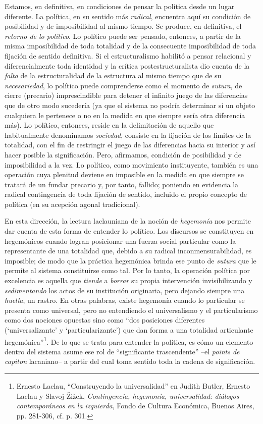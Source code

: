 Estamos, en definitiva, en condiciones de pensar la política desde un
lugar diferente. La política, en su sentido más \emph{radical},
encuentra aquí su condición de posibilidad y de imposibilidad al mismo
tiempo. Se produce, en definitiva, el \emph{retorno de lo político}. Lo
político puede ser pensado, entonces, a partir de la misma imposibilidad
de toda totalidad y de la consecuente imposibilidad de toda fijación de
sentido definitiva. Si el estructuralismo habilitó a pensar relacional y
diferencialmente toda identidad y la crítica postestructuralista dio
cuenta de la \emph{falta} de la estructuralidad de la estructura al
mismo tiempo que de su \emph{necesariedad}, lo político puede
comprenderse como el momento de \emph{sutura}, de cierre (precario)
imprescindible para detener el infinito juego de las diferencias que de
otro modo sucedería (ya que el sistema no podría determinar si un objeto
cualquiera le pertenece o no en la medida en que siempre sería otra
diferencia más). Lo político, entonces, reside en la delimitación de
aquello que habitualmente denominamos \emph{sociedad}, consiste en la
fijación de los límites de la totalidad, con el fin de restringir el
juego de las diferencias hacia su interior y así hacer posible la
significación. Pero, afirmamos, condición de posibilidad y de
imposibilidad a la vez. Lo político, como movimiento instituyente,
también es una operación cuya plenitud deviene en imposible en la medida
en que siempre se tratará de un fundar precario y, por tanto, fallido;
poniendo en evidencia la radical contingencia de toda fijación de
sentido, incluido el propio concepto de política (en su acepción agonal
tradicional).

En esta dirección, la lectura laclauniana de la noción de
\emph{hegemonía} nos permite dar cuenta de esta forma de entender lo
político. Los discursos se constituyen en hegemónicos cuando logran
posicionar una fuerza social particular como la representante de una
totalidad que, debido a su radical inconmensurabilidad, es imposible; de
modo que la práctica hegemónica brinda ese punto de \emph{sutura} que le
permite al sistema constituirse como tal. Por lo tanto, la operación
política por excelencia es aquella que \emph{tiende} a \emph{borrar} su
propia intervención invisibilizando y \emph{sedimentando} los actos de
su institución originaria, pero dejando siempre una \emph{huella}, un
rastro. En otras palabras, existe hegemonía cuando lo particular se
presenta como universal, pero no entendiendo el universalismo y el
particularismo como dos nociones opuestas sino como \enquote{dos posiciones
diferentes (\enquote{universalizante} y \enquote{particularizante}) que dan forma a
una totalidad articulante hegemónica}\footnote{Ernesto Laclau,
  \enquote{Construyendo la universalidad} en Judith Butler, Ernesto Laclau y
  Slavoj Žižek, \emph{Contingencia, hegemonía, universalidad: diálogos
  contemporáneos en la izquierda}, Fondo de Cultura Económica, Buenos
  Aires, pp. 281-306, cf. p. 301.}. De lo que se trata para entender la
política, es cómo un elemento dentro del sistema asume ese rol de
``significante trascendente'' --el \emph{points de capiton} lacaniano--
a partir del cual toma sentido toda la cadena de significación.

